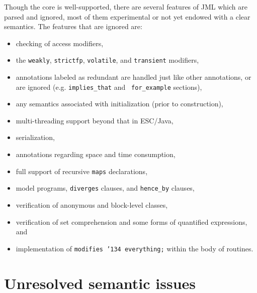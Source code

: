 \documentclass{acm_proc_article-sp}
\begin{document}
Though the core is well-supported, there are several features of JML
which are parsed and ignored, most of them experimental or not yet
endowed with a clear semantics.  The features that are ignored are:
\setlength{\partopsep}{0in}\setlength{\parskip}{0in}\setlength{\itemsep}{0in}\setlength{\topsep}{0in}
\begin{itemize}
\setlength{\partopsep}{0in}\setlength{\parskip}{0in}\setlength{\itemsep}{0in}\setlength{\topsep}{0in}
\item checking of access modifiers,
\item the \texttt{weakly}, \texttt{strictfp}, \texttt{volatile}, and
  \texttt{transient} modifiers,
\item annotations labeled as redundant are handled just like other
  annotations, or are ignored (e.g. \texttt{implies\_that} and {\tt
    for\_example} sections),
\item any semantics associated with initialization (prior to
  construction),
\item multi-threading support beyond that in ESC/Java,
\item serialization,
\item annotations regarding space and time consumption,
\item full support of recursive \texttt{maps} declarations,
\item model programs, \texttt{diverges} clauses, and \texttt{hence\_by}
  clauses,
\item verification of anonymous and block-level classes,
\item verification of set comprehension and some forms of quantified
  expressions, and
\item implementation of \texttt{modifies \char'134 everything;} within the body
  of routines.
\end{itemize}


\section{Unresolved semantic issues}
\end{document}
